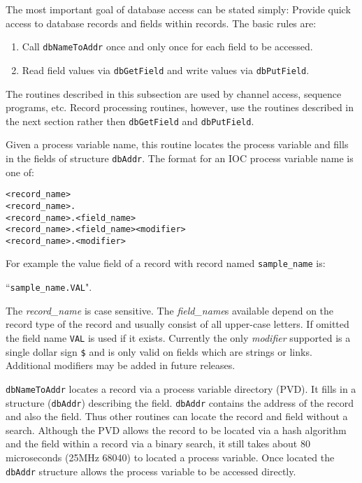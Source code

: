 The most important goal of database access can be stated simply:
Provide quick access to database records and fields within records.
The basic rules are:

\begin{enumerate}

\item Call \verb|dbNameToAddr| once and only once for each field to be accessed.

\item Read field values via \verb|dbGetField| and write values via \verb|dbPutField|.

\end{enumerate}

The routines described in this subsection are used by channel access, sequence programs, etc.
Record processing routines, however, use the routines described in the next section rather then \verb|dbGetField| and \verb|dbPutField|.

Given a process variable name, this routine locates the process variable and fills in the fields of structure \verb|dbAddr|.
The format for an IOC process variable name is one of:

\begin{verbatim}
<record_name>
<record_name>.
<record_name>.<field_name>
<record_name>.<field_name><modifier>
<record_name>.<modifier>
\end{verbatim}

For example the value field of a record with record named \verb|sample_name| is:

       ``\verb|sample_name.VAL|".

The \emph{record\_name} is case sensitive.
The \emph{field\_name}s available depend on the record type of the record and usually consist of all upper-case letters.
If omitted the field name \verb|VAL| is used if it exists.
Currently the only \emph{modifier} supported is a single dollar sign \verb|$| and is only valid on fields which are strings or links.
Additional modifiers may be added in future releases.

\verb|dbNameToAddr| locates a record via a process variable directory (PVD).
It fills in a structure (\verb|dbAddr|) describing the field.
\verb|dbAddr| contains the address of the record and also the field.
Thus other routines can locate the record and field without a search.
Although the PVD allows the record to be located via a hash algorithm and the field within a record via a binary search, it still takes about 80 microseconds (25MHz 68040) to located a process variable.
Once located the \verb|dbAddr| structure allows the process variable to be accessed directly.

